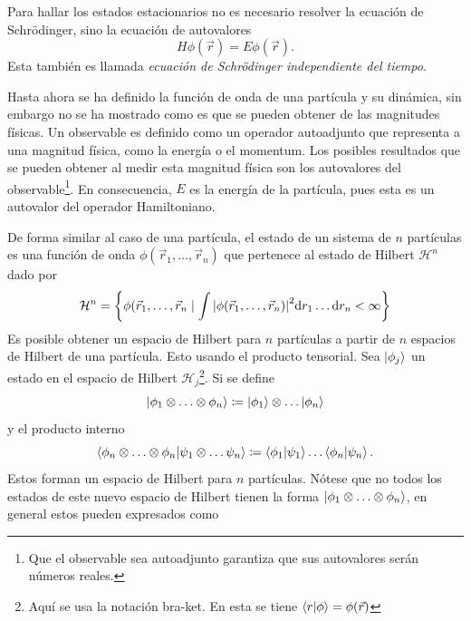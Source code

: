 \noindent Para hallar los estados estacionarios no es necesario resolver la ecuación de Schrödinger, sino la ecuación de autovalores
\begin{equation}
  H \phi(\vec{r}) = E \phi(\vec{r}).\label{eq:schrIndepen}
\end{equation}
Esta también es llamada \emph{ecuación de Schrödinger independiente del tiempo}.\par
\noindent Hasta ahora se ha definido la función de onda de una partícula y su dinámica, sin embargo no se ha mostrado como es que se pueden obtener de las magnitudes físicas. Un observable es definido como un operador autoadjunto que representa a una magnitud física, como la energía o el momentum. Los posibles resultados que se pueden obtener al medir esta magnitud física son los autovalores del observable\footnote{Que el observable sea autoadjunto garantiza que sus autovalores serán números reales.}. En consecuencia, $E$ es la energía de la partícula, pues esta es un autovalor del operador Hamiltoniano.\par
\noindent De forma similar al caso de una partícula, el estado de un sistema de $n$ partículas es una función de onda $\phi(\vec{r}_1, \ldots, \vec{r}_n)$ que pertenece al estado de Hilbert $\mathcal{H}^{n}$ dado por
\begin{equation}
	\mathcal{H}^{n} = \left\{\phi(\vec{r}_1, \ldots, \vec{r}_n \mid \int \abs{\phi(\vec{r}_1, \ldots, \vec{r}_n)}^2 \dd r_1 \ldots \dd r_n < \infty \right\}
\end{equation}
Es posible obtener un espacio de Hilbert para $n$ partículas a partir de $n$ espacios de Hilbert de una partícula. Esto usando el producto tensorial. Sea $\ket{\phi_j}$ un estado en el espacio de Hilbert $\mathcal{H}_j$\footnote{Aquí se usa la notación bra-ket. En esta se tiene $\braket{r}{\phi} = \phi(\vec{r})$ }. Si se define
\begin{equation}
	\ket{\phi_1 \otimes \ldots \otimes \phi_n} \coloneqq \ket{\phi_1} \otimes \ldots \ket{\phi_n}
\end{equation}
y el producto interno
\begin{equation}
	\braket{\phi_n\otimes \ldots \otimes \phi_n}{\psi_1\otimes \ldots \psi_n}\coloneqq \braket{\phi_1}{\psi_1}\ldots\braket{\phi_n}{\psi_n}.
\end{equation}
Estos forman un espacio de Hilbert para $n$ partículas. Nótese que no todos los estados de este nuevo espacio de Hilbert tienen la forma $\ket{\phi_1 \otimes \ldots \otimes \phi_n}$, en general estos pueden expresados como
